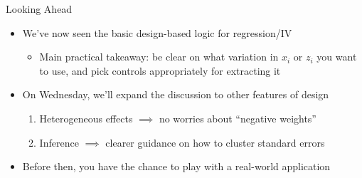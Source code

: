 \documentclass[11pt,english]{beamer}
\begin{document}
\begin{frame}{Looking Ahead}
\begin{itemize}
\item We've now seen the basic design-based logic for regression/IV\smallskip
\begin{itemize}
\item Main practical takeaway: be clear on what variation in $x_i$ or $z_i$ you want to use, and pick controls appropriately for extracting it
\end{itemize}\bigskip\pause{}

\item On Wednesday, we'll expand the discussion to other features of design\smallskip
\begin{enumerate}
\item Heterogeneous effects $\implies$ no worries about ``negative weights''\smallskip
\item Inference $\implies$ clearer guidance on how to cluster standard errors
\end{enumerate}\bigskip\pause{}

\item Before then, you have the chance to play with a real-world application
\end{itemize}
\end{frame}
\end{document}
